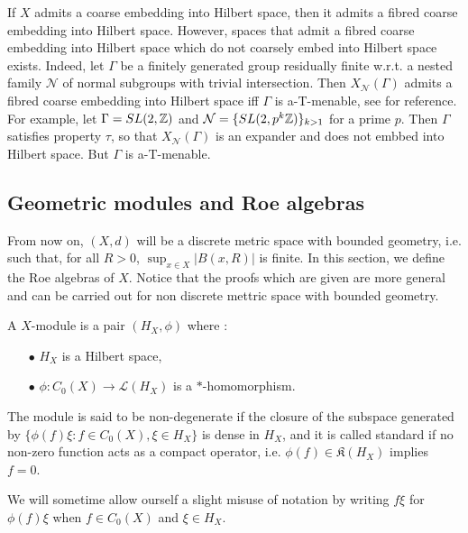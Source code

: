 \begin{rk} If $X$ admits a coarse embedding into Hilbert space, then it admits a fibred coarse embedding into Hilbert space. However, spaces that admit a fibred coarse embedding into Hilbert space which do not coarsely embed into Hilbert space exists. Indeed, let $\Gamma$ be a finitely generated group residually finite w.r.t. a nested family $\mathcal N$ of normal subgroups with trivial intersection. Then $X_{\mathcal N}(\Gamma)$ admits a fibred coarse embedding into Hilbert space iff $\Gamma$ is a-T-menable, see \cite{FinnSellFibred} for reference. For example, let $\Gamma = SL(2,\mathbb Z)$ and $\mathcal N= \{SL(2,p^k\mathbb Z)\}_{k>1}$ for a prime $p$. Then $\Gamma$ satisfies property $\tau$, so that $X_{\mathcal N}(\Gamma)$ is an expander and does not embbed into Hilbert space. But $\Gamma$ is a-T-menable.
\end{rk}


\subsection{Geometric modules and Roe algebras}

From now on, $(X,d)$ will be a discrete metric space with bounded geometry, i.e. such that, for all $R>0$, $\sup_{x\in X} |B(x,R)|$ is finite. In this section, we define the Roe algebras of $X$. Notice that the proofs which are given are more general and can be carried out for non discrete mettric space with bounded geometry. \\  

\begin{definition} A $X$-module is a pair $(H_X,\phi)$ where :
\begin{itemize}
\item[$\bullet$] $H_X$ is a Hilbert space,
\item[$\bullet$] $\phi : C_0(X)\rightarrow \mathcal L(H_X)$ is a $*$-homomorphism. 
\end{itemize}
The module is said to be non-degenerate if the closure of the subspace generated by $\{\phi(f)\xi : f\in C_0(X), \xi\in H_X\}$ is dense in $H_X$, and it is called standard if no non-zero function acts as a compact operator, i.e. $\phi(f) \in\mathfrak K(H_X)$ implies $f=0$.
\end{definition}

We will sometime allow ourself a slight misuse of notation by writing $f\xi$ for $\phi(f)\xi$ when $f\in C_0(X)$ and $\xi \in H_X$.

